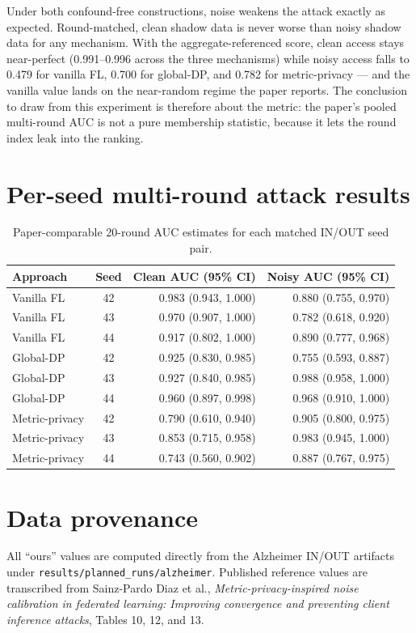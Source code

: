 \documentclass[10pt]{article}
\begin{document}
Under both confound-free constructions, noise weakens the attack exactly as expected. Round-matched, clean
shadow data is never worse than noisy shadow data for any mechanism. With the aggregate-referenced score, clean access
stays near-perfect (0.991--0.996 across the three mechanisms) while noisy access falls to
0.479 for vanilla FL, 0.700 for global-DP, and
0.782 for metric-privacy --- and the vanilla value lands on the near-random
regime the paper reports. The conclusion to draw from this experiment is therefore about the metric: the paper's
pooled multi-round AUC is not a pure membership statistic, because it lets the round index leak into the
ranking.

\clearpage
\section*{Per-seed multi-round attack results}
\begin{table}[h]
\centering
\caption{Paper-comparable 20-round AUC estimates for each matched IN/OUT seed pair.}
\begin{tabular}{lcrr}
\toprule
Approach & Seed & Clean AUC (95\% CI) & Noisy AUC (95\% CI) \\
\midrule
Vanilla FL & 42 & 0.983 (0.943, 1.000) & 0.880 (0.755, 0.970) \\
Vanilla FL & 43 & 0.970 (0.907, 1.000) & 0.782 (0.618, 0.920) \\
Vanilla FL & 44 & 0.917 (0.802, 1.000) & 0.890 (0.777, 0.968) \\
\midrule
Global-DP & 42 & 0.925 (0.830, 0.985) & 0.755 (0.593, 0.887) \\
Global-DP & 43 & 0.927 (0.840, 0.985) & 0.988 (0.958, 1.000) \\
Global-DP & 44 & 0.960 (0.897, 0.998) & 0.968 (0.910, 1.000) \\
\midrule
Metric-privacy & 42 & 0.790 (0.610, 0.940) & 0.905 (0.800, 0.975) \\
Metric-privacy & 43 & 0.853 (0.715, 0.958) & 0.983 (0.945, 1.000) \\
Metric-privacy & 44 & 0.743 (0.560, 0.902) & 0.887 (0.767, 0.975) \\
\bottomrule
\end{tabular}
\end{table}

\section*{Data provenance}
All ``ours'' values are computed directly from the Alzheimer IN/OUT artifacts under
\texttt{results/planned\_runs/alzheimer}. Published reference values are transcribed from
Sainz-Pardo Diaz et al., \emph{Metric-privacy-inspired noise calibration in federated learning:
Improving convergence and preventing client inference attacks}, Tables 10, 12, and 13.
\end{document}

